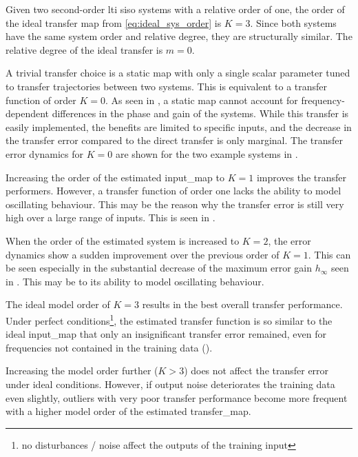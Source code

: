 Given two second-order \acrshort{lti} \acrshort{siso} systems with a relative order of one, the order of the ideal transfer map from \eqref{eq:ideal_sys_order} is $K=3$.
Since both systems have the same system order and relative degree, they are structurally similar. The relative degree of the ideal transfer is $m=0$.

A trivial transfer choice is a static map with only a single scalar parameter tuned to transfer trajectories between two systems. This is equivalent to a transfer function of order $K=0$. As seen in , a static map cannot account for frequency-dependent differences in the phase and gain of the systems.
While this transfer is easily implemented, the benefits are limited to specific inputs, and the decrease in the transfer error compared to the direct transfer is only marginal. The transfer error dynamics for $K=0$ are shown for the two example systems in .

Increasing the order of the estimated \gls*{input_map} to $K=1$ improves the transfer performers. However, a transfer function of order one lacks the ability to model oscillating behaviour. This may be the reason why the transfer error is still very high over a large range of inputs. This is seen in .

When the order of the estimated system is increased to $K=2$, the error dynamics show a sudden improvement over the previous order of $K=1$. This can be seen especially in the substantial decrease of the maximum error gain $h_{\infty}$ seen in . This may be to its ability to model oscillating behaviour. 

The ideal model order of $K=3$ results in the best overall transfer performance. Under perfect conditions\footnote{no disturbances / noise affect the outputs of the training input}, the estimated transfer function is so similar to the ideal \gls*{input_map} that only an insignificant transfer error remained, even for frequencies not contained in the training data ().

Increasing the model order further ($K>3$) does not affect the transfer error under ideal conditions. However, if output noise deteriorates the training data even slightly, outliers with very poor transfer performance become more frequent with a higher model order of the estimated \gls*{transfer_map}. 


